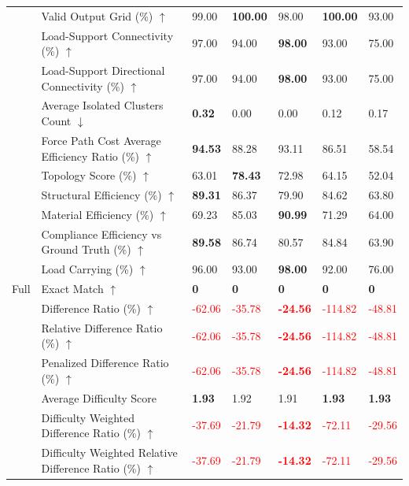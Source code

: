 \begin{table}[!h]
{\begin{tabular}{lllllll}
 & Valid Output Grid (\%) $\uparrow$ & 99.00 & \textbf{100.00} & 98.00 & \textbf{100.00} & 93.00 \\
 & Load-Support Connectivity (\%) $\uparrow$ & 97.00 & 94.00 & \textbf{98.00} & 93.00 & 75.00 \\
 & Load-Support Directional Connectivity (\%) $\uparrow$ & 97.00 & 94.00 & \textbf{98.00} & 93.00 & 75.00 \\
 & Average Isolated Clusters Count $\downarrow$ & \textbf{0.32} & 0.00 & 0.00 & 0.12 & 0.17 \\
 & Force Path Cost Average Efficiency Ratio (\%) $\uparrow$ & \textbf{94.53} & 88.28 & 93.11 & 86.51 & 58.54 \\
 & Topology Score (\%) $\uparrow$ & 63.01 & \textbf{78.43} & 72.98 & 64.15 & 52.04 \\
 & Structural Efficiency (\%) $\uparrow$ & \textbf{89.31} & 86.37 & 79.90 & 84.62 & 63.80 \\
 & Material Efficiency (\%) $\uparrow$ & 69.23 & 85.03 & \textbf{90.99} & 71.29 & 64.00 \\
 & Compliance Efficiency vs Ground Truth (\%) $\uparrow$ & \textbf{89.58} & 86.74 & 80.57 & 84.84 & 63.90 \\
 & Load Carrying (\%) $\uparrow$ & 96.00 & 93.00 & \textbf{98.00} & 92.00 & 76.00 \\
Full & Exact Match $\uparrow$ & \textbf{0} & \textbf{0} & \textbf{0} & \textbf{0} & \textbf{0} \\
 & Difference Ratio (\%) $\uparrow$ & \textcolor{red}{-62.06} & \textcolor{red}{-35.78} & \textbf{\textcolor{red}{-24.56}} & \textcolor{red}{-114.82} & \textcolor{red}{-48.81} \\
 & Relative Difference Ratio (\%) $\uparrow$ & \textcolor{red}{-62.06} & \textcolor{red}{-35.78} & \textbf{\textcolor{red}{-24.56}} & \textcolor{red}{-114.82} & \textcolor{red}{-48.81} \\
 & Penalized Difference Ratio (\%) $\uparrow$ & \textcolor{red}{-62.06} & \textcolor{red}{-35.78} & \textbf{\textcolor{red}{-24.56}} & \textcolor{red}{-114.82} & \textcolor{red}{-48.81} \\
 & Average Difficulty Score & \textbf{1.93} & 1.92 & 1.91 & \textbf{1.93} & \textbf{1.93} \\
 & Difficulty Weighted Difference Ratio (\%) $\uparrow$ & \textcolor{red}{-37.69} & \textcolor{red}{-21.79} & \textbf{\textcolor{red}{-14.32}} & \textcolor{red}{-72.11} & \textcolor{red}{-29.56} \\
 & Difficulty Weighted Relative Difference Ratio (\%) $\uparrow$ & \textcolor{red}{-37.69} & \textcolor{red}{-21.79} & \textbf{\textcolor{red}{-14.32}} & \textcolor{red}{-72.11} & \textcolor{red}{-29.56} \\

\end{tabular}}
\end{table}
